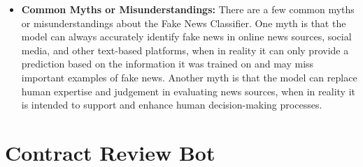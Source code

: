 \begin{itemize}
    \item \textbf{Common Myths or Misunderstandings:} There are a few common myths or misunderstandings about the Fake News Classifier. One myth is that the model can always accurately identify fake news in online news sources, social media, and other text-based platforms, when in reality it can only provide a prediction based on the information it was trained on and may miss important examples of fake news. Another myth is that the model can replace human expertise and judgement in evaluating news sources, when in reality it is intended to support and enhance human decision-making processes.
\end{itemize}

\section{Contract Review Bot}

